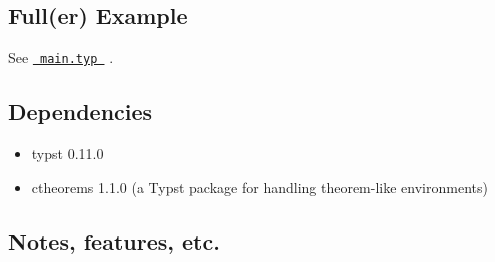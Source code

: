 \subsection{Full(er) Example}\label{fuller-example}

See
\href{https://github.com/avonmoll/ifacconf-typst/blob/main/template/main.typ}{\texttt{\ main.typ\ }}
.

\subsection{Dependencies}\label{dependencies}

\begin{itemize}
\tightlist
\item
  typst 0.11.0
\item
  ctheorems 1.1.0 (a Typst package for handling theorem-like
  environments)
\end{itemize}

\subsection{Notes, features, etc.}\label{notes-features-etc.}

